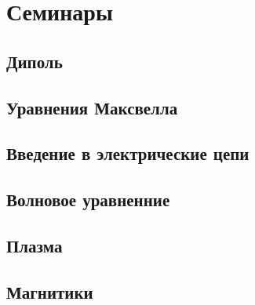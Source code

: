 
% 




\newpage


\newpage
\section{Семинары}

\subsection{Диполь}


\subsection{Уравнения Максвелла}


\subsection{Введение в электрические цепи}



\subsection{Волновое уравненние}


\subsection{Плазма}


\subsection{Магнитики}


% 

